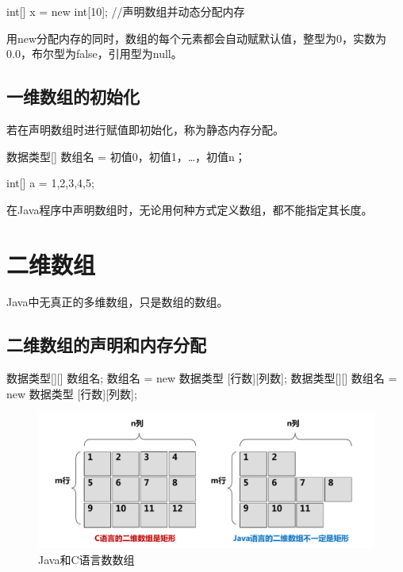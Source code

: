 \begin{javaCode}
  int[] x = new int[10];   //声明数组并动态分配内存
\end{javaCode}


用new分配内存的同时，数组的每个元素都会自动赋默认值，整型为0，实数为0.0，布尔型为false，引用型为null。

\subsection{一维数组的初始化}

若在声明数组时进行赋值即初始化，称为静态内存分配。

\begin{javaCode}
  数据类型[] 数组名 = {初值0，初值1，…，初值n}；
\end{javaCode}


\begin{javaCode}
  int[] a = {1,2,3,4,5};
\end{javaCode}


在Java程序中声明数组时，无论用何种方式定义数组，都不能指定其长度。

\section{二维数组}

Java中无真正的多维数组，只是数组的数组。

\subsection{二维数组的声明和内存分配}

\begin{javaCode}
  数据类型[][] 数组名;
  数组名 = new 数据类型 [行数][列数];
  数据类型[][] 数组名 = new 数据类型 [行数][列数];
\end{javaCode}

\begin{figure}[htb]
\centering
\includegraphics[width=\textwidth]{images/Java-array-and-string/fig-2-dim-array.pdf}
\caption{Java和C语言数数组}
\label{fig:java-and-c-array}
\end{figure}

